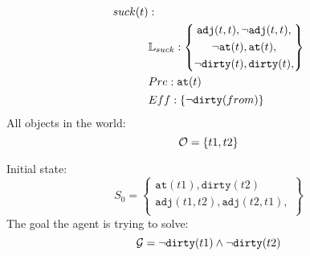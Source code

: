 \documentclass[\master/Master.tex]{subfiles}
\begin{document}
\begin{align*}
	suck(t) &: \\
	&\mathbb{L}_{suck} : 
	\left\{
	\begin{gathered}
		\texttt{adj}(t,t), \neg \texttt{adj}(t,t), \\					
		\neg \texttt{at}(t), \texttt{at}(t), \\			
		\neg \texttt{dirty}(t), \texttt{dirty}(t), \\
	\end{gathered}
	\right\}
	\\
	& Pre : 
	\begin{gathered}
		\texttt{at}(t)
	\end{gathered}
	\\
	& Eff : \{
	\begin{gathered}
		\neg \texttt{dirty}(from)
	\end{gathered}\}
	\\
\end{align*}
All objects in the world:
\begin{equation*}
	\mathcal{O} = \{t1,t2\}
\end{equation*}

Initial state:
    \begin{equation*}
        S_0 =
        \left\{
            \begin{gathered}
                \texttt{at}(t1),\texttt{dirty}(t2) \\
                \texttt{adj}(t1,t2), \texttt{adj}(t2,t1), \\
            \end{gathered}
        \right\}
    \end{equation*}
The goal the agent is trying to solve:
\begin{equation*}
	\mathcal{G} = \neg \texttt{dirty}(t1) \land \neg \texttt{dirty}(t2) 
\end{equation*}
\end{document}
